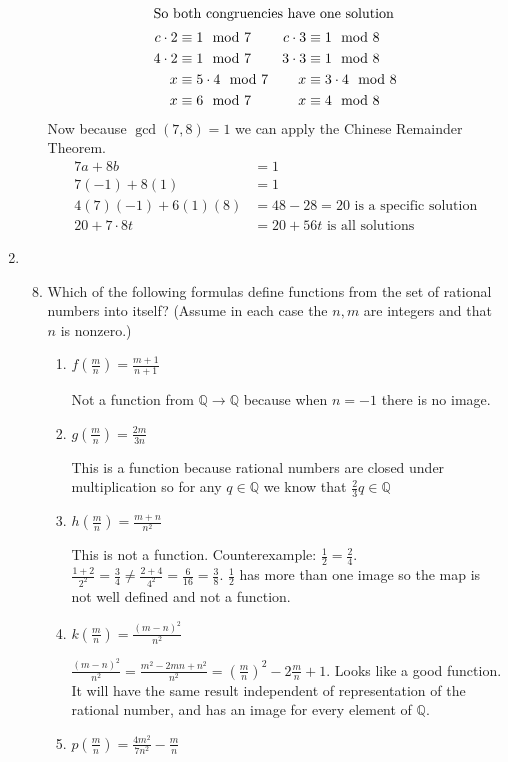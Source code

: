 \documentclass[letterpaper]{article}
\begin{document}
\begin{enumerate}
\begin{enumerate}
\begin{align*}
  \intertext{So both congruencies have one solution}
  c\cdot2&\equiv1\mod 7&c\cdot3&\equiv1\mod8\\
  4\cdot2&\equiv1\mod 7&3\cdot3&\equiv1\mod8\\
  x&\equiv5\cdot4\mod7&x&\equiv3\cdot4\mod8\\
  x&\equiv6\mod7&x&\equiv4\mod8\\
\end{align*}
Now because $\gcd(7,8)=1$ we can apply the Chinese Remainder Theorem.
\begin{align*}
  7a+8b&=1\\
  7(-1)+8(1)&=1\\
  4(7)(-1)+6(1)(8)&=48-28=20\text{ is a specific solution}\\
  20+7\cdot8t&=20+56t\text{ is all solutions}
\end{align*}
\end{enumerate}
\renewcommand{\labelenumi}{2.\arabic{enumi}}
\setcounter{enumi}{0}
\item
\begin{enumerate}
\setcounter{enumii}{7}
\item
Which of the following formulas define functions from the set of rational numbers into itself? (Assume in each case the $n,m$ are integers and that $n$ is nonzero.)
\begin{enumerate}
\item
$\displaystyle f\left(\frac{m}{n}\right)=\frac{m+1}{n+1}$

Not a function from $\mathbb{Q}\to\mathbb{Q}$ because when $n=-1$ there is no image.
\item
$\displaystyle g\left(\frac{m}{n}\right)=\frac{2m}{3n}$

This is a function because rational numbers are closed under multiplication so for any $q\in\mathbb{Q}$ we know that $\frac{2}{3}q\in\mathbb{Q}$
\item
$\displaystyle h\left(\frac{m}{n}\right)=\frac{m+n}{n^2}$

This is not a function. Counterexample: $\frac{1}{2}=\frac{2}{4}$. $\frac{1+2}{2^2}=\frac{3}{4}\ne\frac{2+4}{4^2}=\frac{6}{16}=\frac{3}{8}$. $\frac{1}{2}$ has more than one image so the map is not well defined and not a function.
\item
$\displaystyle k\left(\frac{m}{n}\right)=\frac{(m-n)^2}{n^2}$

$\displaystyle \frac{(m-n)^2}{n^2}=\frac{m^2-2mn+n^2}{n^2}=\left(\frac{m}{n}\right)^2-2\frac{m}{n}+1$. Looks like a good function. It will have the same result independent of representation of the rational number, and has an image for every element of $\mathbb{Q}$.
\item
$\displaystyle p\left(\frac{m}{n}\right)=\frac{4m^2}{7n^2}-\frac{m}{n}$


\end{enumerate}
\end{enumerate}
\end{enumerate}
\end{document}
